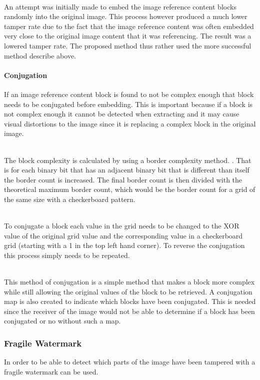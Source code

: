 \documentclass[12pt]{article}
\begin{document}
\hspace{0pt} \\
An attempt was initially made to embed the image reference content blocks randomly into the original image.
This process however produced a much lower tamper rate due to the fact that the image reference content was often embedded very close to the original image content that it was referencing.
The result was a lowered tamper rate.
The proposed method thus rather used the more successful method describe above.

\paragraph{Conjugation}
If an image reference content block is found to not be complex enough that block needs to be conjugated before embedding.
This is important because if a block is not complex enough it cannot be detected when extracting and it may cause visual distortions to the image since it is replacing a complex block in the original image.

\hspace{0pt} \\
The block complexity is calculated by using a border complexity method. \cite{beaullieubpcs}.
That is for each binary bit that has an adjacent binary bit that is different than itself the border count is increased. 
The final border count is then divided with the theoretical maximum border count, which would be the border count for a grid of the same size with a checkerboard pattern.

\hspace{0pt} \\
To conjugate a block each value in the grid needs to be changed to the XOR value of the original grid value and the corresponding value in a checkerboard grid (starting with a 1 in the top left hand corner).
To reverse the conjugation this process simply needs to be repeated.

\hspace{0pt} \\
This method of conjugation is a simple method that makes a block more complex while still allowing the original values of the block to be retrieved.
A conjugation map is also created to indicate which blocks have been conjugated.
This is needed since the receiver of the image would not be able to determine if a block has been conjugated or no without such a map.

\subsubsection{Fragile Watermark}
\label{impFragileWatermark}
In order to be able to detect which parts of the image have been tampered with a fragile watermark can be used.
\end{document}
